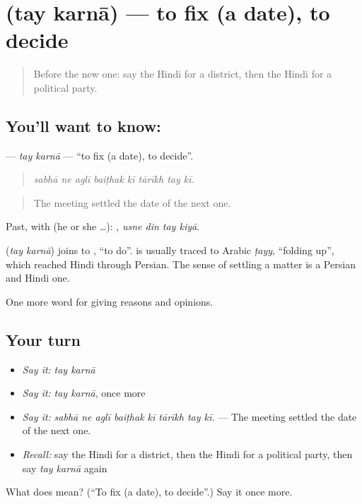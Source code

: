 \section[\texorpdfstring{\hi{तय} \hi{करना} (tay karnā)}{तय करना (tay karnā)}]{  (tay karnā) — to fix (a date), to decide}

\label{lesson:HI-C370-taykarna}



\begin{quote}
Before the new one: say the Hindi for a district, then the Hindi for a political party.
\end{quote}

\subsection*{You'll want to know:  }
\textbf{ } — \emph{tay karnā} — \textquotedblleft{}to fix (a date), to decide\textquotedblright{}.

\begin{quote}
       
\end{quote}

\begin{quote}
\emph{sabhā ne aglī baiṭhak kī tārīkh tay kī.}
\end{quote}

\begin{quote}
The meeting settled the date of the next one.
\end{quote}

Past, with  (he or she …):    , \emph{usne din tay kiyā}.

\begin{cousinweb}
\textbf{ } (\emph{tay karnā}) joins  to , \textquotedblleft{}to do\textquotedblright{}.  is usually traced to Arabic \emph{ṭayy}, \textquotedblleft{}folding up\textquotedblright{}, which reached Hindi through Persian. The sense of settling a matter is a Persian and Hindi one.
\end{cousinweb}

\begin{grammarlens}[title={What you've built}]
One more word for giving reasons and opinions.
\end{grammarlens}

\subsection*{Your turn}
\begin{itemize}
\raggedright
  \item \emph{Say it:} \emph{tay karnā}
  \item \emph{Say it:} \emph{tay karnā}, once more
  \item \emph{Say it:} \emph{sabhā ne aglī baiṭhak kī tārīkh tay kī.} — The meeting settled the date of the next one.
  \item \emph{Recall:} say the Hindi for a district, then the Hindi for a political party, then say \emph{tay karnā} again
\end{itemize}

\begin{tcolorbox}[breakable,colback=teal!4,colframe=teal!35!black,title={Before you move on}]
What does   mean? (\textquotedblleft{}To fix (a date), to decide\textquotedblright{}.) Say it once more.
\end{tcolorbox}
